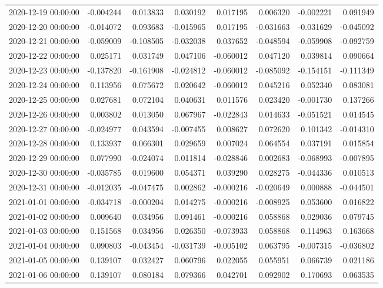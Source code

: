 \begin{tabular}{lrrrrrrr}
2020-12-19 00:00:00 & -0.004244 & 0.013833 & 0.030192 & 0.017195 & 0.006320 & -0.002221 & 0.091949 \\
2020-12-20 00:00:00 & -0.014072 & 0.093683 & -0.015965 & 0.017195 & -0.031663 & -0.031629 & -0.045092 \\
2020-12-21 00:00:00 & -0.059009 & -0.108505 & -0.032038 & 0.037652 & -0.048594 & -0.059908 & -0.092759 \\
2020-12-22 00:00:00 & 0.025171 & 0.031749 & 0.047106 & -0.060012 & 0.047120 & 0.039814 & 0.090664 \\
2020-12-23 00:00:00 & -0.137820 & -0.161908 & -0.024812 & -0.060012 & -0.085092 & -0.154151 & -0.111349 \\
2020-12-24 00:00:00 & 0.113956 & 0.075672 & 0.020642 & -0.060012 & 0.045216 & 0.052340 & 0.083081 \\
2020-12-25 00:00:00 & 0.027681 & 0.072104 & 0.040631 & 0.011576 & 0.023420 & -0.001730 & 0.137266 \\
2020-12-26 00:00:00 & 0.003802 & 0.013050 & 0.067967 & -0.022843 & 0.014633 & -0.051521 & 0.014545 \\
2020-12-27 00:00:00 & -0.024977 & 0.043594 & -0.007455 & 0.008627 & 0.072620 & 0.101342 & -0.014310 \\
2020-12-28 00:00:00 & 0.133937 & 0.066301 & 0.029659 & 0.007024 & 0.064554 & 0.037191 & 0.015854 \\
2020-12-29 00:00:00 & 0.077990 & -0.024074 & 0.011814 & -0.028846 & 0.002683 & -0.068993 & -0.007895 \\
2020-12-30 00:00:00 & -0.035785 & 0.019600 & 0.054371 & 0.039290 & 0.028275 & -0.044336 & 0.010513 \\
2020-12-31 00:00:00 & -0.012035 & -0.047475 & 0.002862 & -0.000216 & -0.020649 & 0.000888 & -0.044501 \\
2021-01-01 00:00:00 & -0.034718 & -0.000204 & 0.014275 & -0.000216 & -0.008925 & 0.053600 & 0.016822 \\
2021-01-02 00:00:00 & 0.009640 & 0.034956 & 0.091461 & -0.000216 & 0.058868 & 0.029036 & 0.079745 \\
2021-01-03 00:00:00 & 0.151568 & 0.034956 & 0.026350 & -0.073933 & 0.058868 & 0.114963 & 0.163668 \\
2021-01-04 00:00:00 & 0.090803 & -0.043454 & -0.031739 & -0.005102 & 0.063795 & -0.007315 & -0.036802 \\
2021-01-05 00:00:00 & 0.139107 & 0.032427 & 0.060796 & 0.022055 & 0.055951 & 0.066739 & 0.021186 \\
2021-01-06 00:00:00 & 0.139107 & 0.080184 & 0.079366 & 0.042701 & 0.092902 & 0.170693 & 0.063535 \\

\end{tabular}
